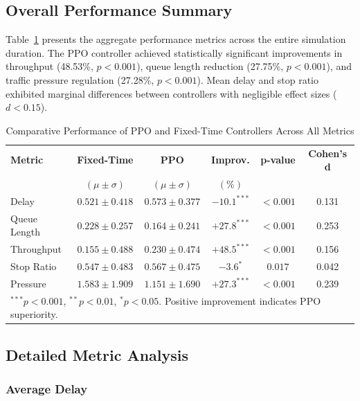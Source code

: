 ﻿\documentclass[11pt, a4paper]{report}
\begin{document}
\subsection{Overall Performance Summary}

Table~\ref{tab:overall_results} presents the aggregate performance metrics across the entire simulation duration. The PPO controller achieved statistically significant improvements in throughput (48.53\%, $p < 0.001$), queue length reduction (27.75\%, $p < 0.001$), and traffic pressure regulation (27.28\%, $p < 0.001$). Mean delay and stop ratio exhibited marginal differences between controllers with negligible effect sizes ($d < 0.15$).

\begin{table}[H]
\centering
\caption{Comparative Performance of PPO and Fixed-Time Controllers Across All Metrics}
\label{tab:overall_results}
\begin{tabular}{lccccc}
\toprule
\textbf{Metric} & \textbf{Fixed-Time} & \textbf{PPO} & \textbf{Improv.} & \textbf{p-value} & \textbf{Cohen's d} \\
 & $(\mu \pm \sigma)$ & $(\mu \pm \sigma)$ & $(\%)$ & & \\
\midrule
Delay & $0.521 \pm 0.418$ & $0.573 \pm 0.377$ & $-10.1^{***}$ & $<0.001$ & 0.131 \\
Queue Length & $0.228 \pm 0.257$ & $0.164 \pm 0.241$ & $+27.8^{***}$ & $<0.001$ & 0.253 \\
Throughput & $0.155 \pm 0.488$ & $0.230 \pm 0.474$ & $+48.5^{***}$ & $<0.001$ & 0.156 \\
Stop Ratio & $0.547 \pm 0.483$ & $0.567 \pm 0.475$ & $-3.6^{*}$ & $0.017$ & 0.042 \\
Pressure & $1.583 \pm 1.909$ & $1.151 \pm 1.690$ & $+27.3^{***}$ & $<0.001$ & 0.239 \\
\bottomrule
\multicolumn{6}{l}{\footnotesize $^{***}p<0.001$, $^{**}p<0.01$, $^{*}p<0.05$. Positive improvement indicates PPO superiority.}
\end{tabular}
\end{table}

\subsection{Detailed Metric Analysis}

\subsubsection{Average Delay}
\end{document}

